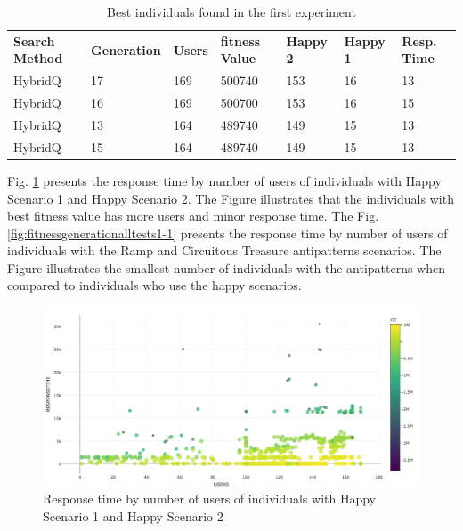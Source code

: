 \begin{table}[h]
\centering
\caption{Best individuals found in the first experiment}
\label{tab:bestindividuals}
\begin{tabular}{lllllll}
\rowcolor[HTML]{C0C0C0} 
\textbf{Search Method} & \textbf{Generation} & \textbf{Users} & \textbf{fitness Value} & \textbf{Happy 2} & \textbf{Happy 1} & \textbf{Resp. Time} \\
HybridQ & 17 & 169 & 500740 & 153 & 16 & 13 \\
HybridQ & 16 & 169 & 500700 & 153 & 16 & 15 \\
HybridQ & 13 & 164 & 489740 & 149 & 15 & 13 \\
HybridQ & 15 & 164 & 489740 & 149 & 15 & 13
\end{tabular}
\end{table}

Fig. \ref{fig:responsetimegenerationalltests1} presents the response time by number of users of individuals with Happy Scenario 1 and Happy Scenario 2. The Figure illustrates that the individuals with best fitness value has more users and minor response time. The Fig. \ref{fig:fitnessgenerationalltests1-1} presents the response time by number of users of individuals with the Ramp and Circuitous Treasure antipatterns scenarios. The Figure illustrates the smallest number of individuals with the antipatterns when compared to individuals who use the happy scenarios.


\begin{figure}[H]
\centering
\includegraphics[width=1\textwidth]{./images/experiment1-7.png}
\caption{Response time by number of users of individuals with Happy Scenario 1 and Happy Scenario 2}
\label{fig:responsetimegenerationalltests1}
\end{figure}


